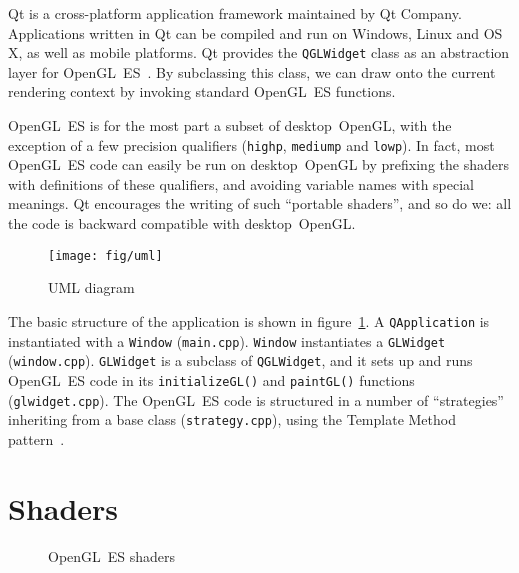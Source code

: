 \documentclass[english,12pt]{ifimaster}
\begin{document}
Qt is a cross-platform application framework maintained by Qt Company.
Applications written in Qt can be compiled and run on Windows, Linux
and OS X, as well as mobile platforms. Qt provides the
\lstinline|QGLWidget| class as an abstraction layer for
OpenGL~ES~\citep{qt15:-qglwidget}. By subclassing this class, we can
draw onto the current rendering context by invoking standard OpenGL~ES
functions.

OpenGL~ES is for the most part a subset of desktop~OpenGL, with the
exception of a few precision qualifiers (\lstinline|highp|,
\lstinline|mediump| and \lstinline|lowp|). In fact, most OpenGL~ES
code can easily be run on desktop~OpenGL by prefixing the shaders with
definitions of these qualifiers, and avoiding variable names with
special meanings. Qt encourages the writing of such ``portable
shaders'', and so do we: all the code is backward compatible with
desktop~OpenGL.

\begin{figure}
  \centering
  \texttt{[image: fig/uml]}
  \caption{UML diagram}
  \label{fig:uml}
\end{figure}

The basic structure of the application is shown in
figure~\ref{fig:uml}. A \lstinline|QApplication| is instantiated with
a \lstinline|Window| (\lstinline|main.cpp|). \lstinline|Window|
instantiates a \lstinline|GLWidget| (\lstinline|window.cpp|).
\lstinline|GLWidget| is a subclass of \lstinline|QGLWidget|, and it
sets up and runs OpenGL~ES code in its \lstinline|initializeGL()| and
\lstinline|paintGL()| functions (\lstinline|glwidget.cpp|). The
OpenGL~ES code is structured in a number of ``strategies'' inheriting
from a base class (\lstinline|strategy.cpp|), using the Template
Method pattern~\citep{erich95:-patterns}.

\section{Shaders}

\begin{figure}
  \centering


  \caption{OpenGL~ES shaders}
  \label{fig:shaders}
\end{figure}
\end{document}
